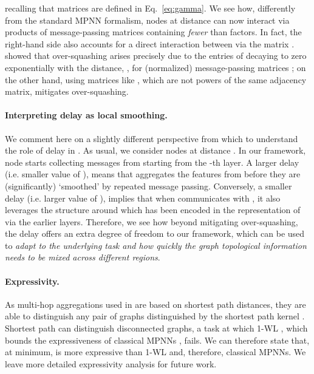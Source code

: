 \documentclass{article}
\theoremstyle{plain}
\theoremstyle{definition}
\theoremstyle{remark}
\begin{document}
\noindent recalling that matrices  are defined in Eq.~\eqref{eq:gamma}. We see how, differently from the standard MPNN formalism, nodes at distance  can now interact via products of message-passing matrices containing {\em fewer} than  factors. In fact, the right-hand side also accounts for a direct interaction between  via the matrix .
\citet{topping2021understanding} showed that over-squashing arises precisely due to the entries  of  decaying to zero exponentially with the distance, , for (normalized) message-passing matrices ; on the other hand, using matrices like , which are not powers of the same adjacency matrix, mitigates over-squashing.




\paragraph{Interpreting delay as local smoothing.}\label{subsec:over-smoothing_analysis}
We comment here on a slightly different perspective from which to understand the role of delay in . As usual, we consider nodes  at distance . In our framework, node  starts collecting messages from  starting from the -th layer. A larger delay (i.e. smaller value of ), means that  aggregates the features from  before they are (significantly) `smoothed' by repeated message passing.
Conversely, a smaller delay (i.e. larger value of ), implies that when  communicates with , it also leverages the structure around  which has been encoded in the representation of  via the earlier layers. Therefore, we see how beyond mitigating over-squashing, the delay offers an extra degree of freedom to our framework, which can be used to {\em adapt to the underlying task and how quickly the graph topological information needs to be mixed across different regions}.



\paragraph{Expressivity.}
As multi-hop aggregations used in  are based on shortest path distances, they are able to distinguish any pair of graphs distinguished by the shortest path kernel \citep{abboud2022shortest,borgwardt2005shortest}. Shortest path can distinguish disconnected graphs,
a task at which 1-WL \citep{weisfeiler1968reduction}, which bounds the expressiveness of classical MPNNs \citep{xu2018powerful}, fails. We can therefore state that, at minimum,  is more expressive than 1-WL and, therefore, classical MPNNs. We leave more detailed expressivity analysis for future work.
\end{document}
